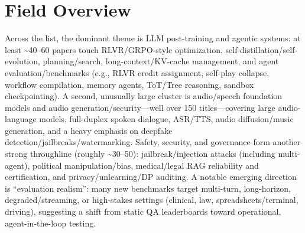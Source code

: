 \documentclass[12pt,letterpaper]{article}
\begin{document}
\medskip



\section*{Field Overview}
{\footnotesize Across the list, the dominant theme is LLM post-training and agentic systems: at least \textasciitilde{}40--60 papers touch RLVR/GRPO-style optimization, self-distillation/self-evolution, planning/search, long-context/KV-cache management, and agent evaluation/benchmarks (e.g., RLVR credit assignment, self-play collapse, workflow compilation, memory agents, ToT/Tree reasoning, sandbox checkpointing). A second, unusually large cluster is audio/speech foundation models and audio generation/security---well over 150 titles---covering large audio-language models, full-duplex spoken dialogue, ASR/TTS, audio diffusion/music generation, and a heavy emphasis on deepfake detection/jailbreaks/watermarking. Safety, security, and governance form another strong throughline (roughly \textasciitilde{}30--50): jailbreak/injection attacks (including multi-agent), political manipulation/bias, medical/legal RAG reliability and certification, and privacy/unlearning/DP auditing. A notable emerging direction is ``evaluation realism'': many new benchmarks target multi-turn, long-horizon, degraded/streaming, or high-stakes settings (clinical, law, spreadsheets/terminal, driving), suggesting a shift from static QA leaderboards toward operational, agent-in-the-loop testing.}
\end{document}
